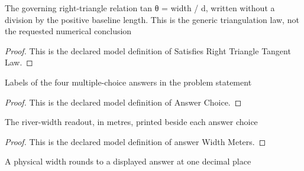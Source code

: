 \begin{definition}
  \label{def:physics:phyx-mini-0676:phyxminiproblems-problemphyxmini0676-satisfiesrighttriangletangentlaw}
  The governing right-triangle relation tan θ = width / d, written without a division by the positive baseline length. This is the generic triangulation law, not the requested numerical conclusion
\end{definition}
\begin{proof}
  This is the declared model definition of Satisfies Right Triangle Tangent Law.
\end{proof}
\begin{definition}
  \label{def:physics:phyx-mini-0676:phyxminiproblems-problemphyxmini0676-answerchoice}
  Labels of the four multiple-choice answers in the problem statement
\end{definition}
\begin{proof}
  This is the declared model definition of Answer Choice.
\end{proof}
\begin{definition}
  \label{def:physics:phyx-mini-0676:phyxminiproblems-problemphyxmini0676-answerwidthmeters}
  The river-width readout, in metres, printed beside each answer choice
\end{definition}
\begin{proof}
  This is the declared model definition of answer Width Meters.
\end{proof}
\begin{definition}
  \label{def:physics:phyx-mini-0676:phyxminiproblems-problemphyxmini0676-matchesanswertonearesttenth}
  A physical width rounds to a displayed answer at one decimal place
\end{definition}
